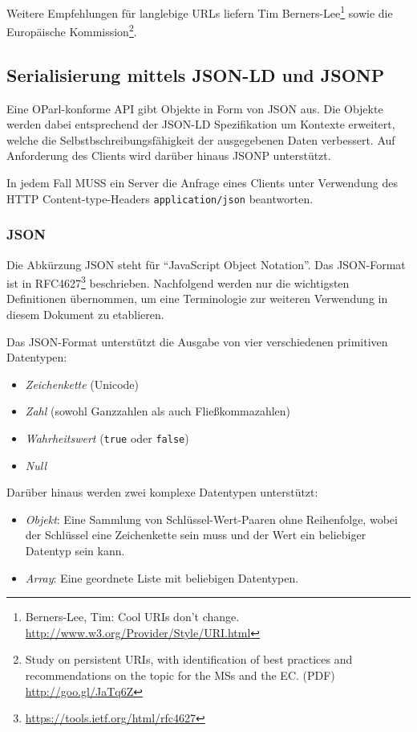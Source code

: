 \documentclass[,a4paper]{article}
\begin{document}
Weitere Empfehlungen für langlebige URLs liefern Tim
Berners-Lee\footnote{Berners-Lee, Tim: Cool URIs don't change.
  \url{http://www.w3.org/Provider/Style/URI.html}} sowie die Europäische
Kommission\footnote{Study on persistent URIs, with identification of
  best practices and recommendations on the topic for the MSs and the
  EC. (PDF) \url{http://goo.gl/JaTq6Z}}.

\subsection{Serialisierung mittels JSON-LD und
JSONP}\label{serialisierung-mittels-json-ld-und-jsonp}

Eine OParl-konforme API gibt Objekte in Form von JSON aus. Die Objekte
werden dabei entsprechend der JSON-LD Spezifikation um Kontexte
erweitert, welche die Selbstbschreibungsfähigkeit der ausgegebenen Daten
verbessert. Auf Anforderung des Clients wird darüber hinaus JSONP
unterstützt.

In jedem Fall MUSS ein Server die Anfrage eines Clients unter Verwendung
des HTTP Content-type-Headers \texttt{application/json} beantworten.

\subsubsection{JSON}\label{json}

Die Abkürzung JSON steht für ``JavaScript Object Notation''. Das
JSON-Format ist in RFC4627\footnote{\url{https://tools.ietf.org/html/rfc4627}}
beschrieben. Nachfolgend werden nur die wichtigsten Definitionen
übernommen, um eine Terminologie zur weiteren Verwendung in diesem
Dokument zu etablieren.

Das JSON-Format unterstützt die Ausgabe von vier verschiedenen
primitiven Datentypen:

\begin{itemize}
\itemsep1pt\parskip0pt
\item
  \emph{Zeichenkette} (Unicode)
\item
  \emph{Zahl} (sowohl Ganzzahlen als auch Fließkommazahlen)
\item
  \emph{Wahrheitswert} (\texttt{true} oder \texttt{false})
\item
  \emph{Null}
\end{itemize}

Darüber hinaus werden zwei komplexe Datentypen unterstützt:

\begin{itemize}
\itemsep1pt\parskip0pt
\item
  \emph{Objekt}: Eine Sammlung von Schlüssel-Wert-Paaren ohne
  Reihenfolge, wobei der Schlüssel eine Zeichenkette sein muss und der
  Wert ein beliebiger Datentyp sein kann.
\item
  \emph{Array}: Eine geordnete Liste mit beliebigen Datentypen.
\end{itemize}
\end{document}

